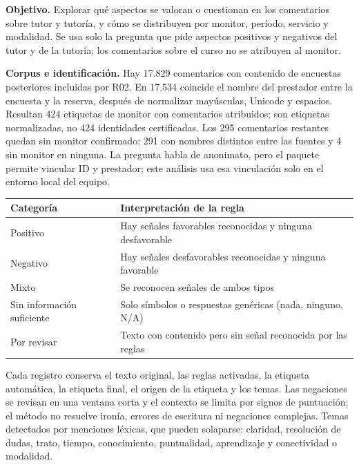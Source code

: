 \documentclass[11pt,letterpaper]{article}
\begin{document}
\textbf{Objetivo.} Explorar qué aspectos se valoran o cuestionan en los comentarios sobre tutor y tutoría, y cómo se distribuyen por monitor, período, servicio y modalidad. Se usa solo la pregunta que pide aspectos positivos y negativos del tutor y de la tutoría; los comentarios sobre el curso no se atribuyen al monitor.

\textbf{Corpus e identificación.} Hay 17.829 comentarios con contenido de encuestas posteriores incluidas por R02. En 17.534 coincide el nombre del prestador entre la encuesta y la reserva, después de normalizar mayúsculas, Unicode y espacios. Resultan 424 etiquetas de monitor con comentarios atribuidos; son etiquetas normalizadas, no 424 identidades certificadas. Los 295 comentarios restantes quedan sin monitor confirmado: 291 con nombres distintos entre las fuentes y 4 sin monitor en ninguna. La pregunta habla de anonimato, pero el paquete permite vincular ID y prestador; este análisis usa esa vinculación solo en el entorno local del equipo.

\begingroup\small\setlength{\tabcolsep}{4pt}\renewcommand{\arraystretch}{1.15}
\begin{longtable}{>{\raggedright\arraybackslash}p{}>{\raggedright\arraybackslash}p{}}
\toprule
\textbf{Categoría} & \textbf{Interpretación de la regla} \\
\midrule
\endhead
Positivo & Hay señales favorables reconocidas y ninguna desfavorable \\
Negativo & Hay señales desfavorables reconocidas y ninguna favorable \\
Mixto & Se reconocen señales de ambos tipos \\
Sin información suficiente & Solo símbolos o respuestas genéricas (nada, ninguno, N/A) \\
Por revisar & Texto con contenido pero sin señal reconocida por las reglas \\
\bottomrule
\end{longtable}
\endgroup


Cada registro conserva el texto original, las reglas activadas, la etiqueta automática, la etiqueta final, el origen de la etiqueta y los temas. Las negaciones se revisan en una ventana corta y el contexto se limita por signos de puntuación; el método no resuelve ironía, errores de escritura ni negaciones complejas. Temas detectados por menciones léxicas, que pueden solaparse: claridad, resolución de dudas, trato, tiempo, conocimiento, puntualidad, aprendizaje y conectividad o modalidad.
\end{document}
